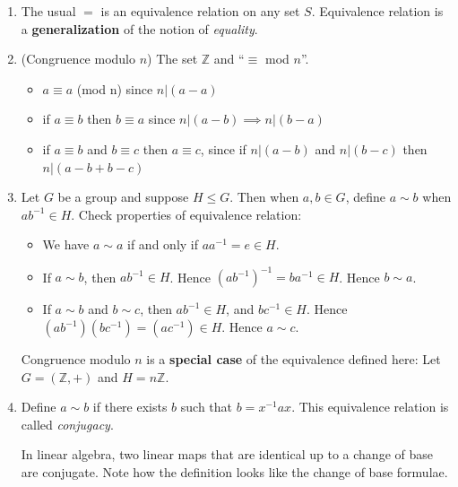 \begin{example}
	\begin{enumerate}
		\item 
	The usual $=$ is an equivalence relation on any set $S$. Equivalence relation is a \textbf{generalization} of the notion of \textit{equality}.
\item (Congruence modulo $n$) The set $\mathbb{Z}$ and ``$\equiv$  mod  $n$''.
	\begin{itemize}
		\item $a \equiv a $ (mod n) since $n | (a-a)$
		\item if  $a \equiv b$ then $b \equiv a$ since $n|(a-b) \implies n|(b-a)$
		\item if $a\equiv b$ and $b \equiv c$ then $a \equiv c$, since if $n|(a-b)$ and $n|(b-c)$ then $n|(a-b+b-c)$
	\end{itemize}
\item Let $G$ be a group and suppose $H \le G$.
	Then when $a,b \in G$, define $a\sim b$ when $ab^{-1} \in H$. Check properties of equivalence relation:
	\begin{itemize}
		\item We have $a \sim a$ if and only if $aa^{-1}  = e \in H$.
		\item If $a\sim b$, then $ab^{-1} \in H$. Hence $\left( ab^{-1}  \right) ^{-1} = ba^{-1}  \in H$. Hence $b \sim a$.
		\item If  $a \sim b$ and $b\sim c$, then $ab^{-1}  \in H$, and $bc^{-1} \in H$. Hence $(ab^{-1} )(bc^{-1} ) = (ac^{-1} ) \in H$. Hence $a \sim c$.
	\end{itemize}
	\begin{remark}
		Congruence modulo $n$ is a \textbf{special case} of the equivalence defined here: Let $G = (\mathbb{Z}, +)$ and $H = n\mathbb{Z}$.
	\end{remark}
\item Define $a\sim b$ if there exists $b$ such that $b = x^{-1} ax$. This equivalence relation is called \textit{conjugacy}.
	\begin{intuition}
		In linear algebra, two linear maps that are identical up to a change of base are conjugate. Note how the definition looks like the change of base formulae.
	\end{intuition}
	\end{enumerate}
\end{example}

